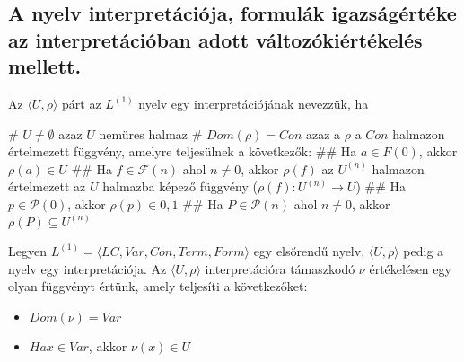 \subsection{A nyelv interpretációja, formulák igazságértéke az interpretációban adott változókiértékelés mellett.}
\begin{definition}
	Az $\langle U, \rho\rangle$ párt az $L^{(1)}$ nyelv egy interpretációjának nevezzük, ha\\
	\begin{easylist}
		# $U \neq \emptyset$ azaz $U$ nemüres halmaz
		# $Dom(\rho) = Con$ azaz a $\rho$ a $Con$ halmazon értelmezett függvény, amelyre teljesülnek a következők:
		## Ha $a \in F(0)$, akkor $\rho(a) \in U$
		## Ha $f \in \mathcal{F}(n)$ ahol $n\neq 0$, akkor $\rho(f)$ az $U^{(n)}$ halmazon értelmezett az $U$ halmazba képező függvény ($\rho(f) : U^{(n)} \rightarrow U $)
		## Ha $p \in \mathcal{P}(0)$, akkor $\rho(p) \in {0, 1}$
		## Ha $P \in \mathcal{P}(n)$ ahol $n \neq 0$, akkor $\rho(P) \subseteq U^{(n)}$
	\end{easylist}
\end{definition}
\begin{definition}
	Legyen $L^{(1)} = \langle LC, Var, Con, Term, Form\rangle$ egy elsőrendű nyelv, $\langle U, \rho\rangle$ pedig a nyelv egy interpretációja. Az $\langle U, \rho\rangle$ interpretációra támaszkodó $\nu$ értékelésen egy olyan függvényt értünk, amely teljesíti a következőket:
	\begin{itemize}
		\item  $ Dom(\nu) = Var $
		\item  $ Ha x \in Var$, akkor $\nu(x) \in U $
	\end{itemize}
\end{definition}
